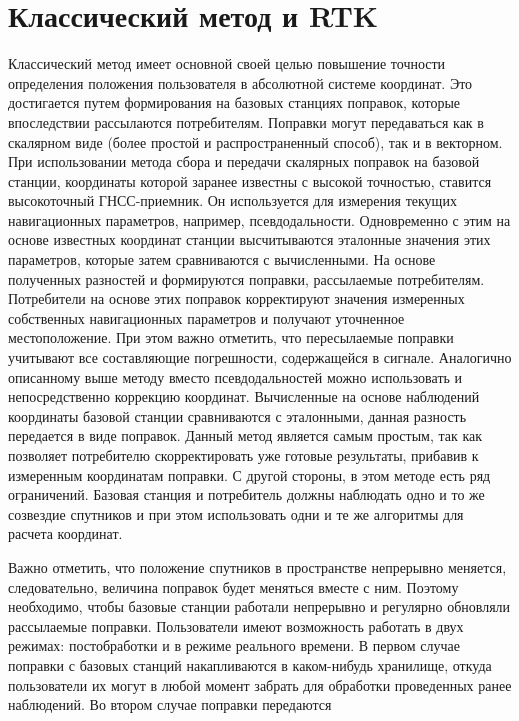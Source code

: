 \documentclass[a4paper,12pt]{report}
\begin{document}
\section{Классический метод и RTK}
\par Классический метод имеет основной своей целью повышение точности определения положения пользователя в абсолютной системе координат. Это 
достигается путем формирования на базовых станциях поправок, которые впоследствии рассылаются потребителям. Поправки могут передаваться 
как в скалярном виде (более простой и распространенный способ), так и в векторном. При использовании метода сбора и передачи скалярных 
поправок на базовой станции, координаты которой заранее известны с высокой точностью, ставится высокоточный ГНСС-приемник. Он используется 
для измерения текущих навигационных параметров, например, псевдодальности. Одновременно с этим на основе известных координат станции 
высчитываются эталонные значения этих параметров, которые затем сравниваются с вычисленными. На основе полученных разностей и формируются 
поправки, рассылаемые потребителям. Потребители на основе этих поправок корректируют значения измеренных собственных навигационных параметров 
и получают уточненное местоположение. При этом важно отметить, что пересылаемые поправки учитывают все составляющие погрешности, содержащейся 
в сигнале. Аналогично описанному выше методу вместо псевдодальностей можно использовать и непосредственно коррекцию координат. Вычисленные на 
основе наблюдений координаты базовой станции сравниваются с эталонными, данная разность передается в виде поправок. Данный метод является самым 
простым, так как позволяет потребителю скорректировать уже готовые результаты, прибавив к измеренным координатам поправки. С другой стороны, 
в этом методе есть ряд ограничений. Базовая станция и потребитель должны наблюдать одно и то же созвездие спутников и при этом использовать 
одни и те же алгоритмы для расчета координат. \par
Важно отметить, что положение спутников в пространстве непрерывно меняется, следовательно, величина поправок будет меняться вместе с ним. 
Поэтому необходимо, чтобы базовые станции работали непрерывно и регулярно обновляли рассылаемые поправки. Пользователи имеют возможность 
работать в двух режимах: постобработки и в режиме реального времени. В первом случае поправки с базовых станций накапливаются в каком-нибудь 
хранилище, откуда пользователи их могут в любой момент забрать для обработки проведенных ранее наблюдений. Во втором случае поправки передаются 
\end{document}
